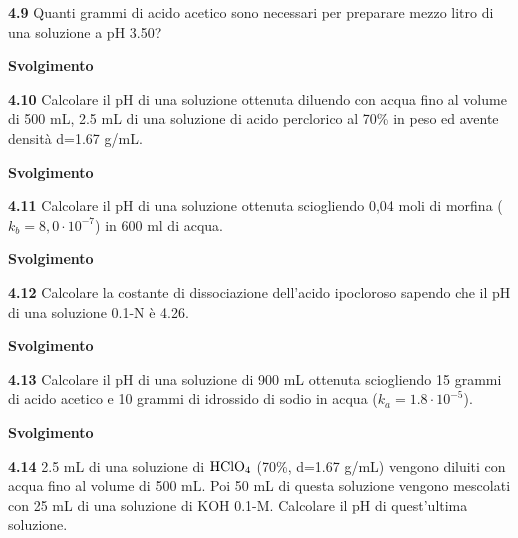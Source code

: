 \vspace{0.2cm}\textbf{4.9} Quanti grammi di acido acetico sono necessari per preparare mezzo litro di una soluzione a pH 3.50?

\vspace{0.2cm}\large\textbf{Svolgimento}\normalsize

\vspace{0.2cm}

\vspace{0.2cm}\textbf{4.10} Calcolare il pH di una soluzione ottenuta diluendo con acqua fino al volume di 500 mL, 2.5 mL
di una soluzione di acido perclorico al 70\% in peso ed avente densità d=1.67 g/mL.

\vspace{0.2cm}\large\textbf{Svolgimento}\normalsize

\vspace{0.2cm}

\vspace{0.2cm}\textbf{4.11} Calcolare il pH di una soluzione ottenuta sciogliendo 0,04 moli di morfina ($k_b = 8,0 \cdot 10^{-7}$) in 600 ml di acqua.

\vspace{0.2cm}\large\textbf{Svolgimento}\normalsize

\vspace{0.2cm}

\vspace{0.2cm}\textbf{4.12} Calcolare la costante di dissociazione dell’acido ipocloroso sapendo che il pH di una soluzione 0.1-N è 4.26.

\vspace{0.2cm}\large\textbf{Svolgimento}\normalsize

\vspace{0.2cm}

\vspace{0.2cm}\textbf{4.13} Calcolare il pH di una soluzione di 900 mL ottenuta sciogliendo 15 grammi di acido acetico e 10 grammi di idrossido di sodio in acqua ($k_a = 1.8 \cdot 10^{-5}$).

\vspace{0.2cm}\large\textbf{Svolgimento}\normalsize

\vspace{0.2cm}

\vspace{0.2cm}\textbf{4.14} 2.5 mL di una soluzione di $\rm HClO_4$ (70\%, d=1.67 g/mL) vengono diluiti con acqua fino al
volume di 500 mL. Poi 50 mL di questa soluzione vengono mescolati con 25 mL di una soluzione di KOH 0.1-M. Calcolare il pH di quest’ultima soluzione.

